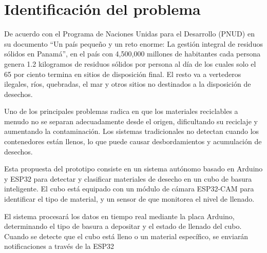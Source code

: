 \section{Identificación del problema}
De acuerdo con el Programa de Naciones Unidas para el Desarrollo (PNUD) en su documento “Un país pequeño y un reto enorme: La gestión integral de residuos sólidos en Panamá”, en el país con 4,500,000 millones de habitantes cada persona genera 1.2 kilogramos de residuos sólidos por persona al día de los cuales solo el 65 por ciento termina en sitios de disposición final. El resto va a vertederos ilegales, ríos, quebradas, el mar y otros sitios no destinados a la disposición de desechos.~\cite{pnud}

Uno de los principales problemas radica en que los materiales reciclables a menudo no se separan adecuadamente desde el origen, dificultando su reciclaje y aumentando la contaminación. Los sistemas tradicionales no detectan cuando los contenedores están llenos, lo que puede causar desbordamientos y acumulación de desechos.

Esta propuesta del prototipo consiste en un sistema autónomo basado en Arduino y ESP32 para detectar y clasificar materiales de desecho en un cubo de basura inteligente. El cubo está equipado con un módulo de cámara ESP32-CAM para identificar el tipo de material, y un sensor de que monitorea el nivel de llenado.

El sistema procesará los datos en tiempo real mediante la placa Arduino, determinando el tipo de basura a depositar y el estado de llenado del cubo. Cuando se detecte que el cubo está lleno o un material específico, se enviarán notificaciones a través de la ESP32